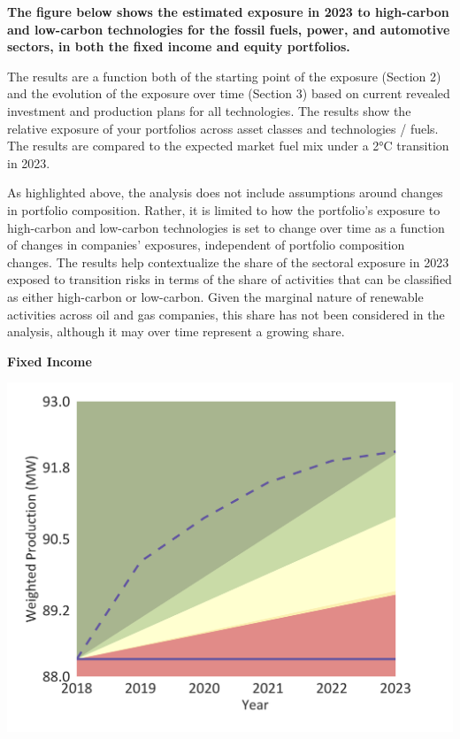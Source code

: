 \documentclass[10pt,table,a4]{article}\usepackage[]{graphicx}\usepackage[]{color}
\begin{document}
	\begin{multicols}{2}
		\textbf{The figure below shows the estimated exposure in 2023 to high-carbon and low-carbon technologies for the fossil fuels, power, and automotive sectors, in both the fixed income and equity portfolios. }
		
		The results are a function both of the starting point of the exposure (Section 2) and the evolution of the exposure over time (Section 3) based on current revealed investment and production plans for all technologies. The results show the relative exposure of your portfolios across asset classes and technologies / fuels. The results are compared to the expected market fuel mix under a 2°C transition in 2023. 
		
		As highlighted above, the analysis does not include assumptions around changes in portfolio composition. Rather, it is limited to how the portfolio's  exposure to high-carbon and low-carbon technologies is set to change over time as a function of changes in companies’ exposures, independent of portfolio composition changes. The results help contextualize the share of the sectoral exposure in 2023 exposed to transition risks in terms of the share of activities that can be classified as either high-carbon or low-carbon. Given the marginal nature of renewable activities across oil and gas companies, this share has not been considered in the analysis, although it may over time represent a growing share. 
		
		
	\end{multicols}
	
	\textbf{Fixed Income}
	
	
	\begin{center}
		\includegraphics[trim = {0 0cm 0 0},width=1\linewidth]{CAFigures/Fig10}
	\end{center}
	
\end{document}

